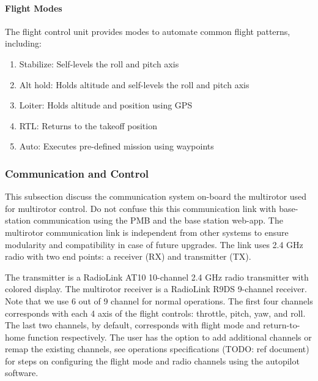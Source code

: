 \paragraph{Flight Modes}
The flight control unit provides modes to automate common flight patterns, including:

\begin{enumerate}

    \item Stabilize: Self-levels the roll and pitch axis
    
    \item Alt hold: Holds altitude and self-levels the roll and pitch axis
    
    \item Loiter: Holds altitude and position using GPS
    
    \item RTL: Returns to the takeoff position
    
    \item Auto: Executes pre-defined mission using waypoints
    
\end{enumerate}

\subsubsection{Communication and Control}

This subsection discuss the communication system on-board the multirotor used for multirotor control. Do not confuse this this communication link with base-station communication using the PMB and the base station web-app.
The multirotor communication link is independent from other systems to ensure modularity and compatibility in case of future upgrades.
The link uses 2.4 GHz radio with two end points: a receiver (RX) and transmitter (TX).

The transmitter is a RadioLink AT10 10-channel 2.4 GHz radio transmitter with colored display\cite{at10}. The multirotor receiver is a RadioLink R9DS 9-channel receiver\cite{r9ds}. Note that we use 6 out of 9 channel for normal operations.
The first four channels corresponds with each 4 axis of the flight controls: throttle, pitch, yaw, and roll. The last two channels, by default, corresponds with flight mode and return-to-home function respectively. 
The user has the option to add additional channels or remap the existing channels, see operations specifications (TODO: ref document) for steps on configuring the flight mode and radio channels using the autopilot software.
